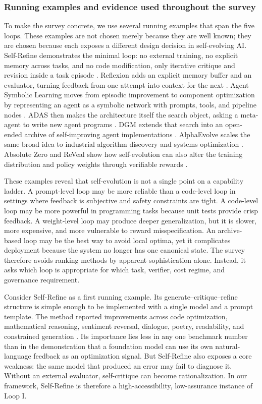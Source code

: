 \subsubsection{Running examples and evidence used throughout the survey}

To make the survey concrete, we use several running examples that span the five loops. These examples are not chosen merely because they are well known; they are chosen because each exposes a different design decision in self-evolving AI. Self-Refine demonstrates the minimal loop: no external training, no explicit memory across tasks, and no code modification, only iterative critique and revision inside a task episode \cite{selfrefine2023}. Reflexion adds an explicit memory buffer and an evaluator, turning feedback from one attempt into context for the next \cite{reflexion2023}. Agent Symbolic Learning moves from episodic improvement to component optimization by representing an agent as a symbolic network with prompts, tools, and pipeline nodes \cite{agentsymboliclearning2024}. ADAS then makes the architecture itself the search object, asking a meta-agent to write new agent programs \cite{adas2025}. DGM extends that search into an open-ended archive of self-improving agent implementations \cite{darwingodelmachine2025}. AlphaEvolve scales the same broad idea to industrial algorithm discovery and systems optimization \cite{alphaevolve2025}. Absolute Zero and ReVeal show how self-evolution can also alter the training distribution and policy weights through verifiable rewards \cite{absolutezero2025,reveal2025}.

These examples reveal that self-evolution is not a single point on a capability ladder. A prompt-level loop may be more reliable than a code-level loop in settings where feedback is subjective and safety constraints are tight. A code-level loop may be more powerful in programming tasks because unit tests provide crisp feedback. A weight-level loop may produce deeper generalization, but it is slower, more expensive, and more vulnerable to reward misspecification. An archive-based loop may be the best way to avoid local optima, yet it complicates deployment because the system no longer has one canonical state. The survey therefore avoids ranking methods by apparent sophistication alone. Instead, it asks which loop is appropriate for which task, verifier, cost regime, and governance requirement.

Consider Self-Refine as a first running example. Its generate--critique--refine structure is simple enough to be implemented with a single model and a prompt template. The method reported improvements across code optimization, mathematical reasoning, sentiment reversal, dialogue, poetry, readability, and constrained generation \cite{selfrefine2023}. Its importance lies less in any one benchmark number than in the demonstration that a foundation model can use its own natural-language feedback as an optimization signal. But Self-Refine also exposes a core weakness: the same model that produced an error may fail to diagnose it. Without an external evaluator, self-critique can become rationalization. In our framework, Self-Refine is therefore a high-accessibility, low-assurance instance of Loop I.

